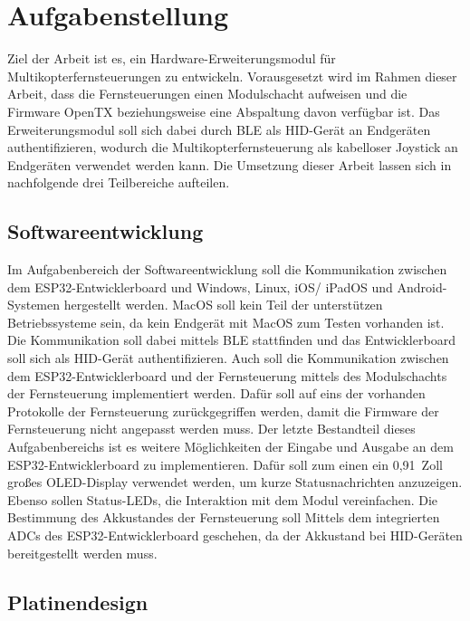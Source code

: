 
\chapter{Aufgabenstellung}

Ziel der Arbeit ist es, ein Hardware-Erweiterungsmodul für Multikopterfernsteuerungen zu entwickeln. Vorausgesetzt wird im Rahmen dieser Arbeit, dass die Fernsteuerungen einen Modulschacht aufweisen und die Firmware OpenTX \cite{opentxMain} beziehungsweise eine Abspaltung davon verfügbar ist. Das Erweiterungsmodul soll sich dabei durch \acs{BLE} als \acs{HID}-Gerät an Endgeräten authentifizieren, wodurch die Multikopterfernsteuerung als kabelloser Joystick an Endgeräten verwendet werden kann. Die Umsetzung dieser Arbeit lassen sich in nachfolgende drei Teilbereiche aufteilen.

\section{Softwareentwicklung}

Im Aufgabenbereich der Softwareentwicklung soll die Kommunikation zwischen dem ESP32-Entwicklerboard und Windows, Linux, iOS/ iPadOS und Android-Systemen hergestellt werden. MacOS soll kein Teil der unterstützen Betriebssysteme sein, da kein Endgerät mit MacOS zum Testen vorhanden ist. Die Kommunikation soll dabei mittels \acs{BLE} stattfinden und das Entwicklerboard soll sich als \acs{HID}-Gerät authentifizieren. Auch soll die Kommunikation zwischen dem ESP32-Entwicklerboard und der Fernsteuerung mittels des Modulschachts der Fernsteuerung implementiert werden. Dafür soll auf eins der vorhanden Protokolle der Fernsteuerung zurückgegriffen werden, damit die Firmware der Fernsteuerung nicht angepasst werden muss. Der letzte Bestandteil dieses Aufgabenbereichs ist es weitere Möglichkeiten der Eingabe und Ausgabe an dem ESP32-Entwicklerboard zu implementieren. Dafür soll zum einen ein 0,91~Zoll großes OLED-Display verwendet werden, um kurze Statusnachrichten anzuzeigen. Ebenso sollen Status-LEDs, die Interaktion mit dem Modul vereinfachen. Die Bestimmung des Akkustandes der Fernsteuerung soll Mittels dem integrierten \acp{ADC} des ESP32-Entwicklerboard geschehen, da der Akkustand bei \acs{HID}-Geräten bereitgestellt werden muss.

\section{Platinendesign}

